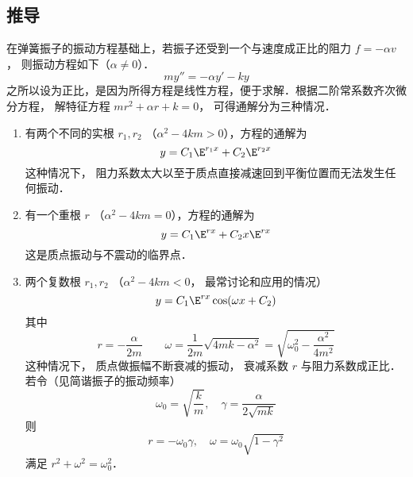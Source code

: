 \subsection{推导}
在弹簧振子的振动方程基础上，若振子还受到一个与速度成正比的阻力 $f =  - \alpha v$， 则振动方程如下（$\alpha \ne 0$）．
\begin{equation}
my'' =  - \alpha y' - ky
\end{equation}
之所以设为正比，是因为所得方程是线性方程，便于求解．根据二阶常系数齐次微分方程， 解特征方程 $m r^2 + \alpha r + k = 0$， 可得通解分为三种情况．
\begin{enumerate}
\item 有两个不同的实根 $r_1, r_2$ （$\alpha ^2 - 4km > 0$），方程的通解为
\begin{equation}
y = C_1 \E^{r_1 x} + C_2 \E^{r_2 x}
\end{equation}
这种情况下， 阻力系数太大以至于质点直接减速回到平衡位置而无法发生任何振动．

\item 有一个重根 $r$ （$\alpha ^2 - 4km = 0$），方程的通解为
\begin{equation}
y = C_1 \E^{rx} + C_2 x \E^{rx}
\end{equation}
这是质点振动与不震动的临界点．

\item 两个复数根 $r_1,r_2$ （$\alpha ^2 - 4km < 0$， 最常讨论和应用的情况）
\begin{equation}
y = C_1 \E^{rx}\cos(\omega x + C_2)
\end{equation}
其中
\begin{equation}
r =  - \frac{\alpha }{2m}
\qquad
\omega = \frac{1}{2m}\sqrt {4mk - \alpha ^2}  = \sqrt{\omega _0^2 - \frac{\alpha ^2}{4 m^2}}
\end{equation}
这种情况下， 质点做振幅不断衰减的振动， 衰减系数 $r$ 与阻力系数成正比． 若令（见简谐振子的振动频率）
\begin{equation}
\omega _0 = \sqrt{\frac{k}{m}}, \quad \gamma  = \frac{\alpha }{2\sqrt{mk}}
\end{equation}
则 
\begin{equation}
r =  - \omega _0 \gamma,\quad \omega  = \omega _0 \sqrt{1 - \gamma ^2}
\end{equation}
满足
$r^2 + \omega ^2 = \omega _0^2$．
\end{enumerate}



